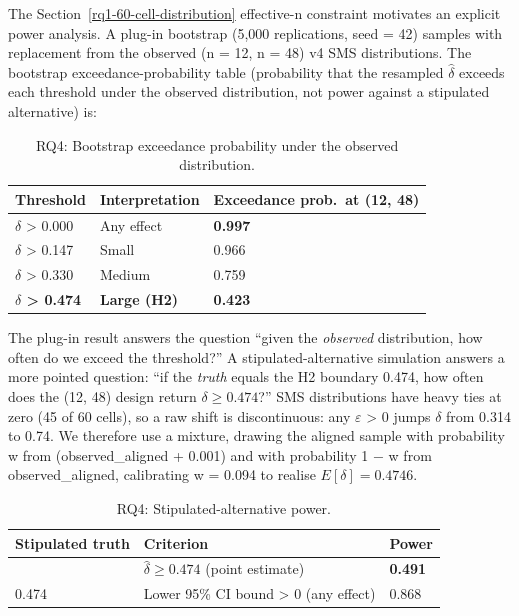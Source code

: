 \documentclass[manuscript,screen,review]{acmart}
\begin{document}
The Section~\ref{rq1-60-cell-distribution} effective-n constraint motivates an explicit power analysis. A
plug-in bootstrap (5,000 replications, seed = 42) samples with
replacement from the observed (n = 12, n = 48) v4 SMS distributions. The
bootstrap exceedance-probability table (probability that the resampled
$\hat\delta$ exceeds each threshold under the observed distribution, not
power against a stipulated alternative) is:

{%
\begin{longtable}[]{@{}lll@{}}
\caption{RQ4: Bootstrap exceedance probability under the observed
distribution.}\\
\toprule\noalign{}
Threshold & Interpretation & Exceedance prob.\ at (12, 48) \\
\midrule\noalign{}
\endhead
\bottomrule\noalign{}
\endlastfoot
$\delta$ \textgreater{} 0.000 & Any effect & \textbf{0.997} \\
$\delta$ \textgreater{} 0.147 & Small & 0.966 \\
$\delta$ \textgreater{} 0.330 & Medium & 0.759 \\
\textbf{$\delta$ \textgreater{} 0.474} & \textbf{Large (H2)} &
\textbf{0.423} \\
\end{longtable}
}

The plug-in result answers the question ``given the \emph{observed}
distribution, how often do we exceed the threshold?'' A
stipulated-alternative simulation answers a more pointed question: ``if
the \emph{truth} equals the H2 boundary 0.474, how often does the (12,
48) design return $\delta \geq 0.474$?'' SMS distributions have heavy ties at zero
(45 of 60 cells), so a raw shift is discontinuous: any $\varepsilon$ \textgreater{}
0 jumps $\delta$ from 0.314 to 0.74. We therefore use a mixture, drawing the
aligned sample with probability w from (observed\_aligned + 0.001) and
with probability 1 $-$ w from observed\_aligned, calibrating w = 0.094 to
realise $E[\delta] = 0.4746$.

{%
\begin{longtable}[]{@{}lll@{}}
\caption{RQ4: Stipulated-alternative power.}\label{tab:p2-11}\\
\toprule\noalign{}
Stipulated truth & Criterion & Power \\
\midrule\noalign{}
\endfirsthead
\endhead
\bottomrule\noalign{}
\endlastfoot
0.474 & $\hat{\delta} \geq 0.474$ (point estimate) & \textbf{0.491} \\
0.474 & Lower 95\% CI bound \textgreater{} 0 (any effect) & 0.868 \\
\end{longtable}
}
\end{document}

